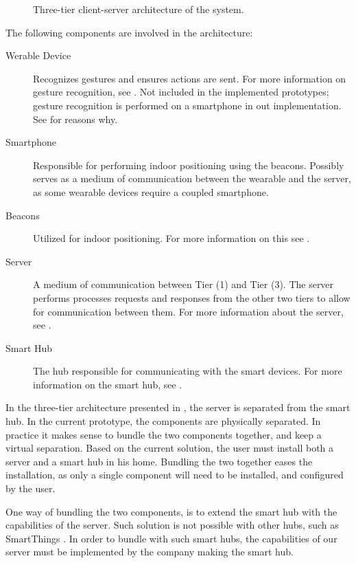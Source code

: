 \begin{figure}[H]
  \centering
  
  \caption{Three-tier client-server architecture of the system.}
  \label{fig:architecture}
\end{figure}

The following components are involved in the architecture:
\begin{description}
    \item[Werable Device] Recognizes gestures and ensures actions are sent. For more information on gesture recognition, see . Not included in the implemented prototypes; gesture recognition is performed on a smartphone in out implementation. See  for reasons why. 
    \item[Smartphone] Responsible for performing indoor positioning using the beacons. Possibly serves as a medium of communication between the wearable and the server, as some wearable devices require a coupled smartphone.
    \item[Beacons] Utilized for indoor positioning. For more information on this see .
    \item[Server] A medium of communication between Tier (1) and Tier (3). The server performs processes requests and responses from the other two tiers to allow for communication between them. For more information about the server, see .
    \item[Smart Hub] The hub responsible for communicating with the smart devices. For more information on the smart hub, see .
\end{description}

In the three-tier architecture presented in , 
the server is separated from the smart hub. 
In the current prototype, 
the components are physically separated. 
In practice it makes sense to bundle the two components together, 
and keep a virtual separation. 
Based on the current solution, 
the user must install both a server and a smart hub in his home. 
Bundling the two together eases the installation, 
as only a single component will need to be installed, 
and configured by the user.

One way of bundling the two components, 
is to extend the smart hub with the capabilities of the server.
Such solution is not possible with other hubs, such as SmartThings \cite{SMARTTHINGS}.
In order to bundle with such smart hubs, 
the capabilities of our server must be implemented by the company making the smart hub. 


